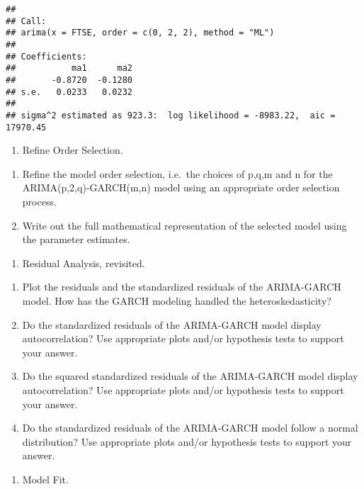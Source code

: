 \documentclass[
]{article}
\providecommand{\tightlist}{%
  \setlength{\itemsep}{0pt}\setlength{\parskip}{0pt}}
\begin{document}
\begin{verbatim}
## 
## Call:
## arima(x = FTSE, order = c(0, 2, 2), method = "ML")
## 
## Coefficients:
##           ma1      ma2
##       -0.8720  -0.1280
## s.e.   0.0233   0.0232
## 
## sigma^2 estimated as 923.3:  log likelihood = -8983.22,  aic = 17970.45
\end{verbatim}

\begin{enumerate}
\def\labelenumi{\arabic{enumi}.}
\setcounter{enumi}{2}
\tightlist
\item
  Refine Order Selection.
\end{enumerate}

\begin{enumerate}
\def\labelenumi{(\alph{enumi})}
\item
  Refine the model order selection, i.e.~the choices of p,q,m and n for
  the ARIMA(p,2,q)-GARCH(m,n) model using an appropriate order selection
  process.
\item
  Write out the full mathematical representation of the selected model
  using the parameter estimates.
\end{enumerate}

\begin{enumerate}
\def\labelenumi{\arabic{enumi}.}
\setcounter{enumi}{3}
\tightlist
\item
  Residual Analysis, revisited.
\end{enumerate}

\begin{enumerate}
\def\labelenumi{(\alph{enumi})}
\item
  Plot the residuals and the standardized residuals of the ARIMA-GARCH
  model. How has the GARCH modeling handled the heteroskedasticity?
\item
  Do the standardized residuals of the ARIMA-GARCH model display
  autocorrelation? Use appropriate plots and/or hypothesis tests to
  support your answer.
\item
  Do the squared standardized residuals of the ARIMA-GARCH model display
  autocorrelation? Use appropriate plots and/or hypothesis tests to
  support your answer.
\item
  Do the standardized residuals of the ARIMA-GARCH model follow a normal
  distribution? Use appropriate plots and/or hypothesis tests to support
  your answer.
\end{enumerate}

\begin{enumerate}
\def\labelenumi{\arabic{enumi}.}
\setcounter{enumi}{4}
\tightlist
\item
  Model Fit.
\end{enumerate}
\end{document}
